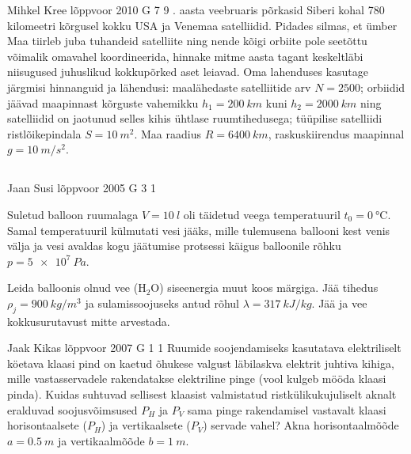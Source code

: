 \documentclass[11pt, twoside]{article}
\begin{document}
{%
{Mihkel Kree} %
{lõppvoor} %
{2010} %
{G 7} %
{9} %
{
. aasta veebruaris põrkasid Siberi kohal 780 kilomeetri kõrgusel kokku USA ja Venemaa satelliidid. Pidades silmas, et ümber Maa tiirleb juba tuhandeid satelliite ning nende kõigi orbiite pole seetõttu võimalik omavahel koordineerida, hinnake mitme aasta tagant keskeltläbi niisugused juhuslikud kokkupõrked aset leiavad. Oma lahenduses kasutage järgmisi hinnanguid ja lähendusi: maalähedaste satelliitide arv $N=\num{2500}$; orbiidid jäävad maapinnast kõrguste vahemikku $h_1=\SI{200}{km}$ kuni $h_2=\SI{2000}{km}$ ning satelliidid on jaotunud selles kihis ühtlase ruumtihedusega; tüüpilise satelliidi ristlõikepindala $S=\SI{10}{m^2}$. Maa raadius $R=\SI{6400}{km}$, raskuskiirendus maapinnal $g=\SI{10}{m/s^2}$.
\fi
}
\newpage\subsection{\protect{}}

{Jaan Susi} %
{lõppvoor} %
{2005} %
{G 3} %
{1} %
{
\ifStatement
Suletud balloon ruumalaga $V = \SI{10}{l}$ oli täidetud veega temperatuuril $t_0 = \SI{0}{\celsius}$. Samal temperatuuril külmutati vesi jääks, mille tulemusena ballooni kest venis välja ja vesi avaldas kogu jäätumise protsessi käigus balloonile rõhku $p = \SI{5e7}{Pa}$.

Leida balloonis olnud vee ($\mathrm{H_2O}$) siseenergia muut koos märgiga. Jää tihedus $\rho_j = \SI{900}{kg/m^3}$ ja sulamissoojuseks antud rõhul $\lambda = \SI{317}{kJ/kg}$. Jää ja vee kokkusurutavust mitte arvestada. 
\fi
}

{Jaak Kikas} %
{lõppvoor} %
{2007} %
{G 1} %
{1} %
{
\ifStatement
Ruumide soojendamiseks kasutatava elektriliselt köetava klaasi pind on kaetud õhukese valgust läbilaskva elektrit juhtiva kihiga, mille vastasservadele rakendatakse elektriline pinge (vool kulgeb mööda klaasi pinda). Kuidas suhtuvad sellisest klaasist valmistatud ristkülikukujuliselt aknalt eralduvad soojusvõimsused $P_H$ ja $P_V$ sama pinge rakendamisel vastavalt klaasi horisontaalsete ($P_H$) ja vertikaalsete ($P_V$) servade vahel? Akna horisontaalmõõde $a = \SI{0,5}{m}$ ja vertikaalmõõde $b = \SI{1}{m}$.
\fi
}

}
\end{document}
